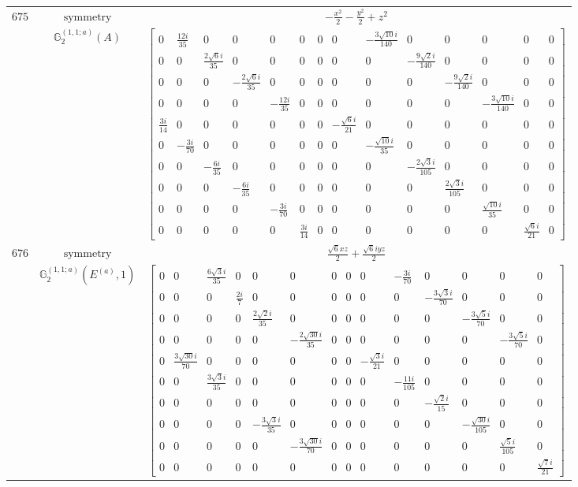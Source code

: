 \documentclass[fleqn,8pt,landscape]{jsarticle}
\begin{document}
\begin{longtable}{ccc}
$ 675 $ & $ \text{symmetry} $ & $ - \frac{x^{2}}{2} - \frac{y^{2}}{2} + z^{2} $ \\
$  $ & $ \mathbb{G}_{2}^{(1,1;a)}(A) $ & $ \begin{bmatrix} 0 & \frac{12 i}{35} & 0 & 0 & 0 & 0 & 0 & 0 & - \frac{3 \sqrt{10} i}{140} & 0 & 0 & 0 & 0 & 0 \\ 0 & 0 & \frac{2 \sqrt{6} i}{35} & 0 & 0 & 0 & 0 & 0 & 0 & - \frac{9 \sqrt{2} i}{140} & 0 & 0 & 0 & 0 \\ 0 & 0 & 0 & - \frac{2 \sqrt{6} i}{35} & 0 & 0 & 0 & 0 & 0 & 0 & - \frac{9 \sqrt{2} i}{140} & 0 & 0 & 0 \\ 0 & 0 & 0 & 0 & - \frac{12 i}{35} & 0 & 0 & 0 & 0 & 0 & 0 & - \frac{3 \sqrt{10} i}{140} & 0 & 0 \\ \frac{3 i}{14} & 0 & 0 & 0 & 0 & 0 & 0 & - \frac{\sqrt{6} i}{21} & 0 & 0 & 0 & 0 & 0 & 0 \\ 0 & - \frac{3 i}{70} & 0 & 0 & 0 & 0 & 0 & 0 & - \frac{\sqrt{10} i}{35} & 0 & 0 & 0 & 0 & 0 \\ 0 & 0 & - \frac{6 i}{35} & 0 & 0 & 0 & 0 & 0 & 0 & - \frac{2 \sqrt{3} i}{105} & 0 & 0 & 0 & 0 \\ 0 & 0 & 0 & - \frac{6 i}{35} & 0 & 0 & 0 & 0 & 0 & 0 & \frac{2 \sqrt{3} i}{105} & 0 & 0 & 0 \\ 0 & 0 & 0 & 0 & - \frac{3 i}{70} & 0 & 0 & 0 & 0 & 0 & 0 & \frac{\sqrt{10} i}{35} & 0 & 0 \\ 0 & 0 & 0 & 0 & 0 & \frac{3 i}{14} & 0 & 0 & 0 & 0 & 0 & 0 & \frac{\sqrt{6} i}{21} & 0 \end{bmatrix} $ \\ \hline
$ 676 $ & $ \text{symmetry} $ & $ \frac{\sqrt{6} x z}{2} + \frac{\sqrt{6} i y z}{2} $ \\
$  $ & $ \mathbb{G}_{2}^{(1,1;a)}(E^{(a)},1) $ & $ \begin{bmatrix} 0 & 0 & \frac{6 \sqrt{3} i}{35} & 0 & 0 & 0 & 0 & 0 & 0 & - \frac{3 i}{70} & 0 & 0 & 0 & 0 \\ 0 & 0 & 0 & \frac{2 i}{7} & 0 & 0 & 0 & 0 & 0 & 0 & - \frac{3 \sqrt{3} i}{70} & 0 & 0 & 0 \\ 0 & 0 & 0 & 0 & \frac{2 \sqrt{2} i}{35} & 0 & 0 & 0 & 0 & 0 & 0 & - \frac{3 \sqrt{5} i}{70} & 0 & 0 \\ 0 & 0 & 0 & 0 & 0 & - \frac{2 \sqrt{30} i}{35} & 0 & 0 & 0 & 0 & 0 & 0 & - \frac{3 \sqrt{5} i}{70} & 0 \\ 0 & \frac{3 \sqrt{30} i}{70} & 0 & 0 & 0 & 0 & 0 & 0 & - \frac{\sqrt{3} i}{21} & 0 & 0 & 0 & 0 & 0 \\ 0 & 0 & \frac{3 \sqrt{3} i}{35} & 0 & 0 & 0 & 0 & 0 & 0 & - \frac{11 i}{105} & 0 & 0 & 0 & 0 \\ 0 & 0 & 0 & 0 & 0 & 0 & 0 & 0 & 0 & 0 & - \frac{\sqrt{2} i}{15} & 0 & 0 & 0 \\ 0 & 0 & 0 & 0 & - \frac{3 \sqrt{3} i}{35} & 0 & 0 & 0 & 0 & 0 & 0 & - \frac{\sqrt{30} i}{105} & 0 & 0 \\ 0 & 0 & 0 & 0 & 0 & - \frac{3 \sqrt{30} i}{70} & 0 & 0 & 0 & 0 & 0 & 0 & \frac{\sqrt{5} i}{105} & 0 \\ 0 & 0 & 0 & 0 & 0 & 0 & 0 & 0 & 0 & 0 & 0 & 0 & 0 & \frac{\sqrt{7} i}{21} \end{bmatrix} $ \\ \hline

\end{longtable}
\end{document}
